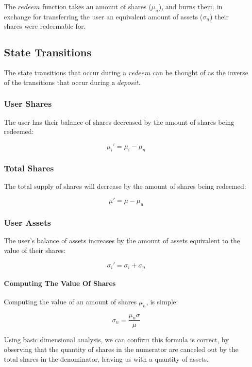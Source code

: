 \documentclass{article}
\begin{document}
The $redeem$ function takes an amount of shares ($
\mu_n$), and burns them, in exchange for transferring the user an equivalent amount of assets ($\sigma_n$) their shares were redeemable for.

\subsection{State Transitions}

The state transitions that occur during a $redeem$ can be thought of as the inverse of the transitions that occur during a $deposit$.

\subsubsection{User Shares}

The user has their balance of shares decreased by the amount of shares being redeemed:

$$ \mu_i' = \mu_i - \mu_n $$

\subsubsection{Total Shares}

The total supply of shares will decrease by the amount of shares being redeemed:

$$ \mu' = \mu - \mu_{u} $$

\subsubsection{User Assets}

The user's balance of assets increases by the amount of assets equivalent to the value of their shares:

$$ \sigma_i' = \sigma_i + \sigma_n $$

\paragraph{Computing The Value Of Shares}

Computing the value of an amount of shares $\mu_n$, is simple:

$$ \sigma_n = \frac{\mu_n\sigma}{\mu} $$

Using basic dimensional analysis, we can confirm this formula is correct, by observing that the quantity of shares in the numerator are canceled out by the total shares in the denominator, leaving us with a quantity of assets.
\end{document}
